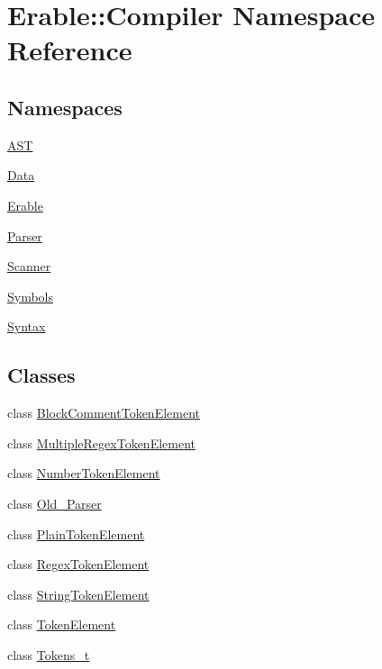 \hypertarget{namespace_erable_1_1_compiler}{}\section{Erable\+::Compiler Namespace Reference}
\label{namespace_erable_1_1_compiler}
\subsection*{Namespaces}
\begin{DoxyCompactItemize}
\item 
 \mbox{\hyperlink{namespace_erable_1_1_compiler_1_1_a_s_t}{A\+ST}}
\item 
 \mbox{\hyperlink{namespace_erable_1_1_compiler_1_1_data}{Data}}
\item 
 \mbox{\hyperlink{namespace_erable_1_1_compiler_1_1_erable}{Erable}}
\item 
 \mbox{\hyperlink{namespace_erable_1_1_compiler_1_1_parser}{Parser}}
\item 
 \mbox{\hyperlink{namespace_erable_1_1_compiler_1_1_scanner}{Scanner}}
\item 
 \mbox{\hyperlink{namespace_erable_1_1_compiler_1_1_symbols}{Symbols}}
\item 
 \mbox{\hyperlink{namespace_erable_1_1_compiler_1_1_syntax}{Syntax}}
\end{DoxyCompactItemize}
\subsection*{Classes}
\begin{DoxyCompactItemize}
\item 
class \mbox{\hyperlink{class_erable_1_1_compiler_1_1_block_comment_token_element}{Block\+Comment\+Token\+Element}}
\item 
class \mbox{\hyperlink{class_erable_1_1_compiler_1_1_multiple_regex_token_element}{Multiple\+Regex\+Token\+Element}}
\item 
class \mbox{\hyperlink{class_erable_1_1_compiler_1_1_number_token_element}{Number\+Token\+Element}}
\item 
class \mbox{\hyperlink{class_erable_1_1_compiler_1_1_old___parser}{Old\+\_\+\+Parser}}
\item 
class \mbox{\hyperlink{class_erable_1_1_compiler_1_1_plain_token_element}{Plain\+Token\+Element}}
\item 
class \mbox{\hyperlink{class_erable_1_1_compiler_1_1_regex_token_element}{Regex\+Token\+Element}}
\item 
class \mbox{\hyperlink{class_erable_1_1_compiler_1_1_string_token_element}{String\+Token\+Element}}
\item 
class \mbox{\hyperlink{class_erable_1_1_compiler_1_1_token_element}{Token\+Element}}
\item 
class \mbox{\hyperlink{class_erable_1_1_compiler_1_1_tokens__t}{Tokens\+\_\+t}}
\end{DoxyCompactItemize}
